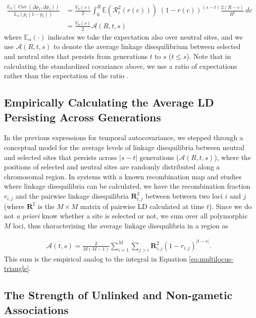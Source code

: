 \documentclass[11pt]{article}
\newcommand{\E}{\mathbb{E}}
\DeclareMathOperator{\cov}{Cov}
\begin{document}
\begin{align}
  \frac{\E_n(\cov(\Delta p_t, \Delta p_s))}{\E_n(p_t(1-p_t)) } %
  &= \frac{V_a(s)}{2} \int_0^R \E(\mathcal{R}_t^2(r(c))) \; (1-r(c))^{(s-t)} \frac{2(R-c)}{R^2} \,d c \\
  &= \frac{V_a(s)}{2} \mathcal{A}(R, t, s)
\end{align}
%
where $\E_n(\cdot)$ indicates we take the expectation also over neutral sites,
and we use $\mathcal{A}(R, t,s)$ to denote the average linkage disequilibrium
between selected and neutral sites that persists from generations $t$ to $s$
($t \le s$). Note that in calculating the standardized covariance above, we use
a ratio of expectations rather than the expectation of the ratio
\parencite{Bhatia2013-zy}.

\subsection{Empirically Calculating the Average LD Persisting Across Generations}
\label{ap:empirical-ld}

In the previous expressions for temporal autocovariance, we stepped through a
conceptual model for the average levels of linkage disequilibria between
neutral and selected sites that persists across $|s-t|$ generations
($\mathcal{A}(R, t,s)$), where the positions of selected and neutral sites are
randomly distributed along a chromosomal region. In systems with a known
recombination map and studies where linkage disequilibria can be calculated, we
have the recombination fraction $r_{i,j}$ and the pairwise linkage
disequilibria $\mathbf{R}^2_{i,j}$ between between two loci $i$ and $j$ (where
$\mathbf{R}^2$ is the $M \times M$ matrix of pairwise LD calculated at time
$t$). Since we do not \emph{a priori} know whether a site is selected or not,
we sum over all polymorphic $M$ loci, thus characterizing the average
linkage disequilibria in a region as

\begin{align}
  \label{eq:supp-emp-assoc}
  \overline{\mathcal{A}(t, s)} = \frac{2}{M(M-1)} \sum_{i=1}^{M} \sum_{j > i} \mathbf{R}_{i,j}^2  (1-r_{i,j})^{|t-s|}.
\end{align}
%
This sum is the empirical analog to the integral in Equation
\eqref{eq:multilocus-triangle}.

\subsection{The Strength of Unlinked and Non-gametic Associations}
\label{ap:strength-assoc}
\end{document}

